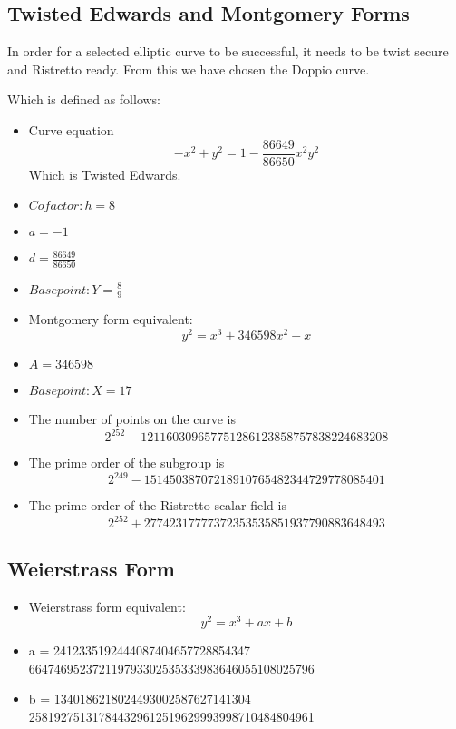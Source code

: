 \documentclass[letterpaper, 10 pt, conference]{ieeeconf}  %
\begin{document}
\subsection{Twisted Edwards and Montgomery Forms}
In order for a selected elliptic curve to be successful, it needs to be twist secure and Ristretto ready. From this we have chosen the Doppio curve. 

Which is defined as follows: \begin{itemize}
    \item Curve equation $$ -x^2+y^2=1-\frac{86649}{86650}x^2y^2 $$ Which is Twisted Edwards.
    \item $Cofactor: h = 8$
    \item $a= -1$
    \item $d= \frac{86649}{86650}$
    \item $Basepoint: Y = \frac{8}{9}$\\
    \item Montgomery form equivalent: $$ y^2=x^3+346598x^2+x $$
    \item $A = 346598 $
    \item $Basepoint: X = 17$\\
    \item The number of points on the curve is $$ 2^{252}-121160309657751286123858757838224683208 $$      
    \item The prime order of the subgroup is $$ 2^{249}-15145038707218910765482344729778085401 $$       \item The prime order of the Ristretto scalar field is  $$ 2^{252} + 27742317777372353535851937790883648493 $$
\end{itemize}

\subsection{Weierstrass Form}
\begin{itemize}
    \item Weierstrass form equivalent: \\  $$y^2=x^3+ax+b $$
    \item a = 2412335192444087404657728854347\\664746952372119793302535333983646055108025796
    \item b = 1340186218024493002587627141304\\258192751317844329612519629993998710484804961\\
\end{itemize}
\end{document}

